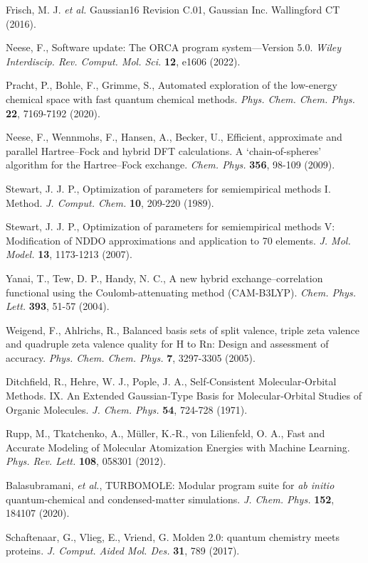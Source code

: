 \documentclass[12pt]{achemso}
\begin{document}
\begin{thebibliography}{99}

Frisch, M. J. \textit{et al.} Gaussian16 {R}evision {C}.01, Gaussian Inc. Wallingford CT (2016).

Neese, F., Software update: The ORCA program system—Version 5.0. \textit{Wiley Interdiscip. Rev. Comput. Mol. Sci.} \textbf{12}, e1606 (2022).

Pracht, P., Bohle, F., Grimme, S., Automated exploration of the low-energy chemical space with fast quantum chemical methods. \textit{Phys. Chem. Chem. Phys.} \textbf{22}, 7169-7192 (2020).

Neese, F., Wennmohs, F., Hansen, A., Becker, U., Efficient, approximate and parallel Hartree–Fock and hybrid DFT calculations. A ‘chain-of-spheres’ algorithm for the Hartree–Fock exchange. \textit{Chem. Phys.} \textbf{356}, 98-109 (2009).

Stewart, J. J. P., Optimization of parameters for semiempirical methods I. Method. \textit{J. Comput. Chem.} \textbf{10}, 209-220 (1989).

Stewart, J. J. P., Optimization of parameters for semiempirical methods V: Modification of NDDO approximations and application to 70 elements. \textit{J. Mol. Model.} \textbf{13}, 1173-1213 (2007).

Yanai, T., Tew, D. P., Handy, N. C., A new hybrid exchange–correlation functional using the Coulomb-attenuating method (CAM-B3LYP). \textit{Chem. Phys. Lett.} \textbf{393}, 51-57 (2004).

Weigend, F., Ahlrichs, R., Balanced basis sets of split valence{,} triple zeta valence and quadruple zeta valence quality for H to Rn: Design and assessment of accuracy. \textit{Phys. Chem. Chem. Phys.} \textbf{7}, 3297-3305 (2005).

Ditchfield, R., Hehre, W. J., Pople, J. A., Self‐Consistent Molecular‐Orbital Methods. IX. An Extended Gaussian‐Type Basis for Molecular‐Orbital Studies of Organic Molecules. \textit{J. Chem. Phys.} \textbf{54}, 724-728 (1971).

Rupp, M., Tkatchenko, A., M\"uller, K.-R., von Lilienfeld, O. A., Fast and Accurate Modeling of Molecular Atomization Energies with Machine Learning. \textit{Phys. Rev. Lett.} \textbf{108}, 058301 (2012).

Balasubramani, \textit{et al.}, TURBOMOLE: Modular program suite for \textit{ab initio} quantum-chemical and condensed-matter simulations. \textit{J. Chem. Phys.} \textbf{152}, 184107 (2020).

Schaftenaar, G., Vlieg, E., Vriend, G. Molden 2.0: quantum chemistry meets proteins. 
\textit{J. Comput. Aided Mol. Des.} \textbf{31}, 789 (2017).


\end{thebibliography}
\end{document}
